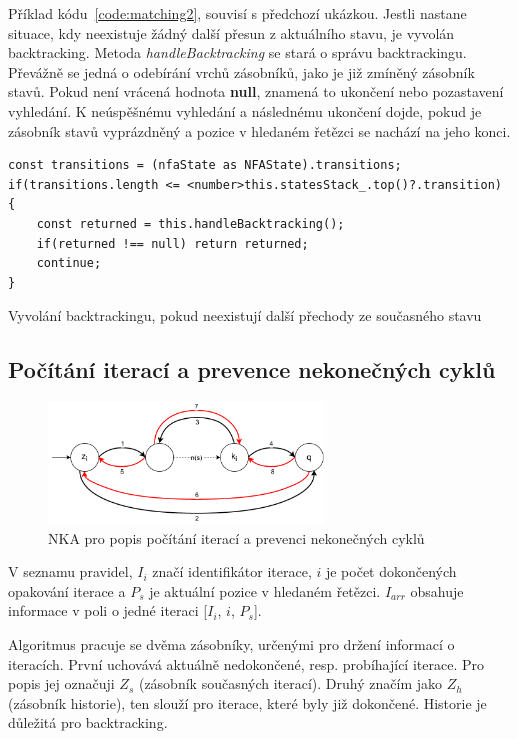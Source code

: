 Příklad kódu~\ref{code:matching2}, souvisí s předchozí ukázkou. 
Jestli nastane situace, kdy neexistuje žádný další přesun z aktuálního stavu, je vyvolán backtracking.
Metoda \textit{handleBacktracking} se stará o správu backtrackingu.
Převážně se jedná o odebírání vrchů zásobníků, jako je již zmíněný zásobník stavů.
Pokud není vrácená hodnota \textbf{null}, znamená to ukončení nebo pozastavení vyhledání.
K neúspěšnému vyhledání a následnému ukončení dojde, pokud je zásobník stavů vyprázdněný a pozice v hledaném řetězci se nachází na jeho konci.

\begin{code}[!ht]
	\begin{verbatim}
const transitions = (nfaState as NFAState).transitions;
if(transitions.length <= <number>this.statesStack_.top()?.transition)
{
	const returned = this.handleBacktracking();
	if(returned !== null) return returned;
	continue;
}
	\end{verbatim}
	\caption{Vyvolání backtrackingu, pokud neexistují další přechody ze současného stavu}
	\label{code:matching2}
\end{code}

\newpage

\subsection*{Počítání iterací a prevence nekonečných cyklů}

\begin{figure}[!h]
	\centering
	\includegraphics[width=0.65\textwidth]{Figures/IterationCount.pdf}
	\caption{NKA pro popis počítání iterací a prevenci nekonečných cyklů}
	\label{fig:ITERCNT}
\end{figure}

V seznamu pravidel, $I_i$ značí identifikátor iterace, $i$ je počet dokončených opakování iterace a $P_s$ je aktuální pozice v hledaném řetězci.
$I_{arr}$ obsahuje informace v poli o jedné iteraci [$I_i$, $i$, $P_s$].

Algoritmus pracuje se dvěma zásobníky, určenými pro držení informací o iteracích. 
První uchovává aktuálně nedokončené, resp. probíhající iterace. 
Pro popis jej označuji $Z_s$ (zásobník současných iterací).
Druhý značím jako $Z_h$ (zásobník historie), ten slouží pro iterace, které byly již dokončené.
Historie je důležitá pro backtracking.

